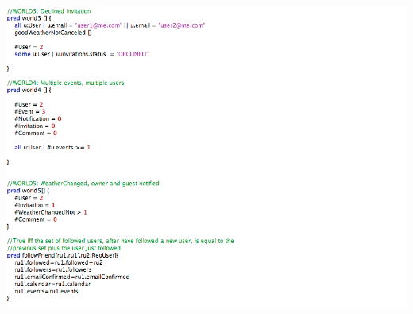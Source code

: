 \documentclass[12pt]{book}
\begin{document}
\includegraphics[width=19cm,height=21cm]{Alloy4}\\
\newpage
\end{document}
